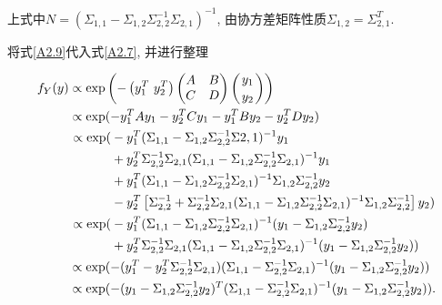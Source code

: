 \begin{pf}
            上式中$N=(\Sigma_{1,1}-\Sigma_{1,2}\Sigma^{-1}_{2,2}\Sigma_{2,1})^{-1}$, 由协方差矩阵性质$\Sigma_{1,2}=\Sigma^{T}_{2,1}$.

            将式\ref{A2.9}代入式\ref{A2.7}, 并进行整理

            \begin{align}\label{A.10}
                f_{Y}(y)&\propto\mathrm{exp}\left( -\left(y^{T}_{1}\ y^{T}_{2}\right)
                \begin{pmatrix}
                    A & B \\
                    C & D \\
                \end{pmatrix}
                \left({y_{1}\atop y_{2}}\right)\right)\notag\\
                &\propto\mathrm{exp}(-y^{T}_{1}Ay_{1}-y^{T}_{2}Cy_{1}-y^{T}_{1}By_{2}-y^{T}_{2}Dy_{2} )\notag\\
                &\begin{aligned}
                    \ \propto\mathrm{exp}(  &-y^{T}_{1}(\Sigma_{1,1}-\Sigma_{1,2}\Sigma^{-1}_{2,2}\Sigma{2,1})^{-1}y_{1} \\ 
                                            &+y^{T}_{2}\Sigma^{-1}_{2,2}\Sigma_{2,1}(\Sigma_{1,1}-\Sigma_{1,2}\Sigma^{-1}_{2,2}\Sigma_{2,1})^{-1}y_{1} \\ 
                                            &+y^{T}_{1}(\Sigma_{1,1}-\Sigma_{1,2}\Sigma^{-1}_{2,2}\Sigma_{2,1})^{-1}\Sigma_{1,2}\Sigma^{-1}_{2,2}y_{2} \\ 
                                            &-y^{T}_{2}\left[\Sigma^{-1}_{2,2}+\Sigma^{-1}_{2,2}\Sigma_{2,1}(\Sigma_{1,1}-\Sigma_{1,2}\Sigma^{-1}_{2,2}\Sigma_{2,1})^{-1}\Sigma_{1,2}\Sigma^{-1}_{2,2}\right]y_{2})  \\
                \end{aligned} \notag\\
                &\begin{aligned}
                    \ \propto\mathrm{exp}(  &-y^{T}_{1}(\Sigma_{1,1}-\Sigma_{1,2}\Sigma^{-1}_{2,2}\Sigma_{2,1})^{-1}(y_{1}-\Sigma_{1,2}\Sigma^{-1}_{2,2}y_{2}) \\ 
                                            &+y^{T}_{2}\Sigma^{-1}_{2,2}\Sigma_{2,1}(\Sigma_{1,1}-\Sigma_{1,2}\Sigma^{-1}_{2,2}\Sigma_{2,1})^{-1}(y_{1}-\Sigma_{1,2}\Sigma^{-1}_{2,2}y_{2})) \\ 
                \end{aligned} \notag\\
                &\propto\mathrm{exp}(-(y^{T}_{1}-y^{T}_{2}\Sigma^{-1}_{2,2}\Sigma_{2,1})(\Sigma_{1,1}-\Sigma^{-1}_{2,2}\Sigma_{2,1})^{-1}(y_{1}-\Sigma_{1,2}\Sigma^{-1}_{2,2}y_{2})) \notag\\
                &\propto\mathrm{exp}(-(y_{1}-\Sigma_{1,2}\Sigma^{-1}_{2,2}y_{2})^{T}(\Sigma_{1,1}-\Sigma^{-1}_{2,2}\Sigma_{2,1})^{-1}(y_{1}-\Sigma_{1,2}\Sigma^{-1}_{2,2}y_{2})).
            \end{align}


\end{pf}
